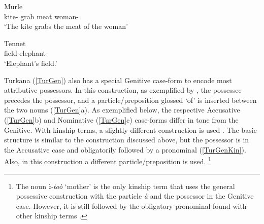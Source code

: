 \begin{exe}
\ex\label{MurGen} {Murle}  \citep[Surmic; Sudan; ][108]{Arensen:1982}\nopagebreak[4]
\gll{}    \\
kite-\nom{} grab meat \relativ{} woman-\gen{}\\
`The kite grabs the meat of the woman' 
\end{exe}

\begin{exe}
\ex\label{TenGen} {Tennet} \citep[Surmic; Sudan; ][230]{Randal:1998}\nopagebreak[4]
\gll{}   \\
field \am{} elephant-\gen{}\\
`Elephant's field.'  
\end{exe}

Turkana (\ref{TurGen}) also has a special Genitive case-form to encode most attributive possessors.
In this construction, as exemplified by \citet[266--268]{Dimmendaal:1982}, the possessee precedes the possessor, and a particle/preposition glossed `of' is inserted between the two nouns (\ref{TurGen}a). 
As exemplified below, the respective Accusative (\ref{TurGen}b) and Nominative (\ref{TurGen}c) case-forms differ in tone from the Genitive.
With kinship terms, a slightly different construction is used \citep[340]{Dimmendaal:1982}. 
The basic structure is similar to the construction discussed above, but the possessor is in the Accusative case and obligatorily followed by a pronominal (\ref{TurGenKin}). 
Also, in this construction a different particle/preposition is used.
\footnote{The noun \emph{\`\i-to\`o} `mother' is the only kinship term that uses the general possessive construction with the particle \emph{\`a} and the possessor in the Genitive case. However, it is still followed by the obligatory pronominal found with other kinship terms \citep[240]{Dimmendaal:1982}.} 

\pagebreak

